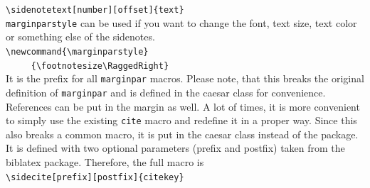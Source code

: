 \documentclass{caesar_book}
\begin{document}
\verb+\sidenotetext[number][offset]{text}+\\
\texttt{marginparstyle} can be used if you want to change the font, text size, text color or something else of the sidenotes.\\
\verb+\newcommand{\marginparstyle}+\\
\verb+     {\footnotesize\RaggedRight}+\\
It is the prefix for all \texttt{marginpar} macros. Please note, that this breaks the original definition of \texttt{marginpar} and is defined in the caesar class for convenience. References can be put in the margin as well. A lot of times, it is more convenient to simply use the existing \texttt{cite} macro and redefine it in a proper way. Since this also breaks a common macro, it is put in the caesar class instead of the package. It is defined with two optional parameters (prefix and postfix) taken from the biblatex package. Therefore, the full macro is\\
\verb+\sidecite[prefix][postfix]{citekey}+\\
\end{document}
